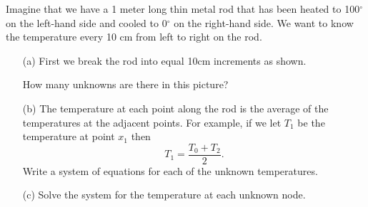 \begin{problem}\label{prob:heated_rod_lin_alg}
    Imagine that we have a 1 meter long thin metal rod that has been heated to 100$^\circ$
    on the left-hand side and cooled to 0$^\circ$ on the right-hand side.  We want to know
    the temperature every 10 cm from left to right on the rod.
    \begin{enumerate}
        \item[(a)] First we break the rod into equal 10cm increments as shown.
            \begin{center}
            \end{center}
            How many unknowns are there in this picture?
        \item[(b)] The temperature at each point along the rod is the average of the
            temperatures at the adjacent points.  For example, if we let $T_1$ be the
            temperature at point $x_1$ then
            \[ T_1 = \frac{T_0 + T_2}{2}. \]
            Write a system of equations for each of the unknown temperatures.
        \item[(c)] Solve the system for the temperature at each unknown node.
    \end{enumerate}
\end{problem}

